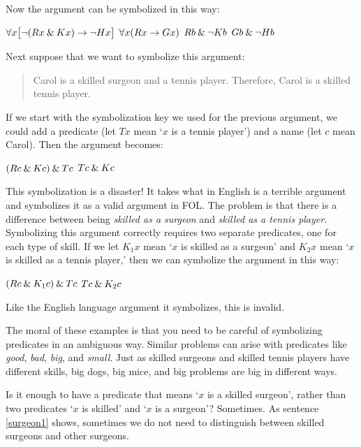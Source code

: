 Now the argument can be symbolized in this way:
\begin{earg}
\label{surgeon2}
\prem $\forall x\bigl[\neg (Rx \mathbin{\&} Kx) \rightarrow \neg Hx\bigr]$
\prem $\forall x(Rx \rightarrow Gx)$
\prem $Rb \mathbin{\&} \neg Kb$
\conc $Gb \mathbin{\&} \neg Hb$
\end{earg}

Next suppose that we want to symbolize this argument:
\begin{quote}
\label{surgeon3}
Carol is a skilled surgeon and a tennis player. Therefore, Carol is a skilled tennis player.
\end{quote}
If we start with the symbolization key we used for the previous argument, we could add a predicate (let $Tx$ mean `$x$ is a tennis player') and a name (let $c$ mean Carol). Then the argument becomes:
\begin{earg}
\prem $(Rc \mathbin{\&} Kc) \mathbin{\&} Tc$
\conc $Tc \mathbin{\&} Kc$
\end{earg}
This symbolization is a disaster! It takes what in English is a terrible argument and symbolizes it as a valid argument in FOL. The problem is that there is a difference between being \emph{skilled as a surgeon} and \emph{skilled as a tennis player}. Symbolizing this argument correctly requires two separate predicates, one for each type of skill. If we let $K_1x$ mean `$x$ is skilled as a surgeon' and $K_2x$ mean `$x$ is skilled as a tennis player,' then we can symbolize the argument in this way:
\begin{earg}
\label{surgeon3correct}
\prem $(Rc \mathbin{\&} K_1c) \mathbin{\&} Tc$
\conc $Tc \mathbin{\&} K_2c$
\end{earg}
Like the English language argument it symbolizes, this is invalid. %

The moral of these examples is that you need to be careful of symbolizing predicates in an ambiguous way. Similar problems can arise with predicates like \emph{good}, \emph{bad}, \emph{big}, and \emph{small}. Just as skilled surgeons and skilled tennis players have different skills, big dogs, big mice, and big problems are big in different ways.

Is it enough to have a predicate that means `$x$ is a skilled surgeon', rather than two predicates `$x$ is skilled' and `$x$ is a surgeon'? Sometimes. As sentence \ref{surgeon1} shows, sometimes we do not need to distinguish between skilled surgeons and other surgeons.

